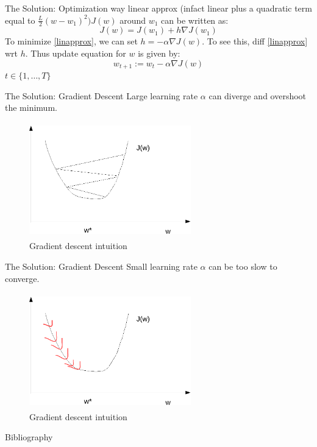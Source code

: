 \documentclass[blue]{beamer}
\begin{document}
\begin{frame}{The Solution: Optimization way}
linear approx (infact linear  plus a quadratic term equal to $\frac{L}{2} (w-w_1)^2 ) J(w)$ around $w_1$ can be written as:
\begin{equation} \label{linapprox}
J(w) = J(w_1) + h\nabla J(w_1)
\end{equation}
To minimize \eqref{linapprox}, we can set $h=-\alpha\nabla J(w)$.  To see this, diff \eqref{linapprox} wrt $h$.
Thus update equation for $w$ is given by:
\begin{equation}
w_{t+1}:= w_t-\alpha \nabla J(w)
\end{equation}
$t \in \{1,\ldots,T\}$
\end{frame}
\begin{frame}{The Solution: Gradient Descent}
Large learning rate \alert{$\alpha$} can diverge and overshoot the minimum.
\begin{figure}
\centering
\includegraphics[width=7cm,height=5cm]{largealpha-crop.pdf}
\caption{Gradient descent intuition}
\label{linear}
\end{figure}
\end{frame}

\begin{frame}{The Solution: Gradient Descent}
Small learning rate \alert{$\alpha$} can be too slow to converge.
\begin{figure}
\centering
\includegraphics[width=7cm,height=5cm]{smallalpha-crop.pdf}
\caption{Gradient descent intuition}
\label{linear}
\end{figure}
\end{frame}

\begin{frame}[allowframebreaks]{Bibliography}
\fontsize{8pt}{7.2}\selectfont


\end{frame}
\end{document}
